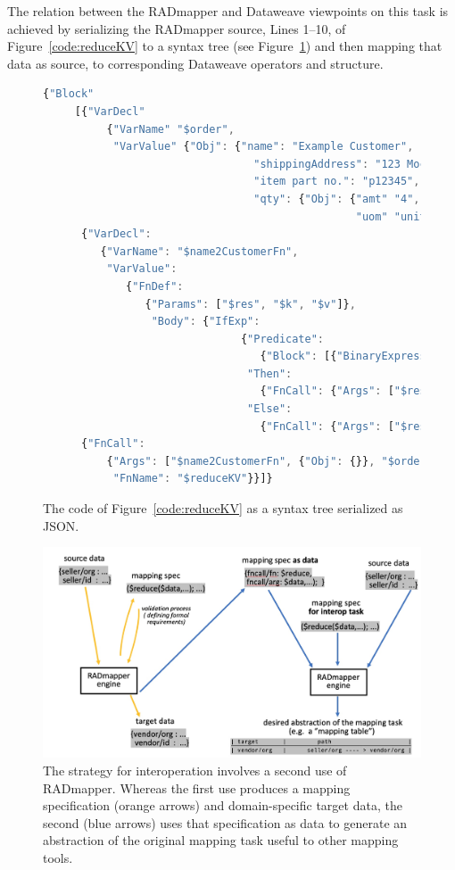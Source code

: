 \documentclass[10pt,letterpaper]{article} %
\begin{document}
The relation between the RADmapper and Dataweave viewpoints on this task is achieved by serializing the RADmapper source, Lines 1--10, of Figure~\ref{code:reduceKV} to a syntax tree
(see Figure~\ref{tree:example-1}) and then mapping that data as source, to corresponding Dataweave operators and structure.

 \begin{figure}[H]
  \caption{The code of Figure~\ref{code:reduceKV} as a syntax tree serialized as JSON.}
 \label{tree:example-1}
\begin{lstlisting}[language=JavaScript,basicstyle=\ttfamily\scriptsize,numberstyle=\scriptsize]
{"Block"
     [{"VarDecl"
          {"VarName" "$order",
           "VarValue" {"Obj": {"name": "Example Customer",
                                 "shippingAddress": "123 Mockingbird Lane...",
                                 "item part no.": "p12345",
                                 "qty": {"Obj": {"amt" "4",
                                                 "uom" "unit"}}}}}},
      {"VarDecl":
         {"VarName": "$name2CustomerFn",
          "VarValue":
             {"FnDef":
                {"Params": ["$res", "$k", "$v"]},
                 "Body": {"IfExp":
                               {"Predicate":
                                  {"Block": [{"BinaryExpression": ["$k", "op/eq", "name"]}]},
                                "Then":
                                  {"FnCall": {"Args": ["$res", "customer", "$v"], "FnName": "$assoc"}},
                                "Else":
                                  {"FnCall": {"Args": ["$res", "$k", "$v"], "FnName": "$assoc"}}}}}}}
      {"FnCall":
          {"Args": ["$name2CustomerFn", {"Obj": {}}, "$order"],
           "FnName": "$reduceKV"}}]}
\end{lstlisting}
\end{figure}  \vspace{-2em}


\begin{figure}[H]
  \caption{The strategy for interoperation involves a second use of RADmapper. Whereas the first use produces a mapping specification (orange arrows) and domain-specific target data, the second (blue arrows) uses that specification as data to generate an abstraction of the original mapping task useful to other mapping tools.}
  \label{fig:ast-strategy}
   \includegraphics[scale=0.28]{ast-strategy.jpg}
 \end{figure}
\end{document}
